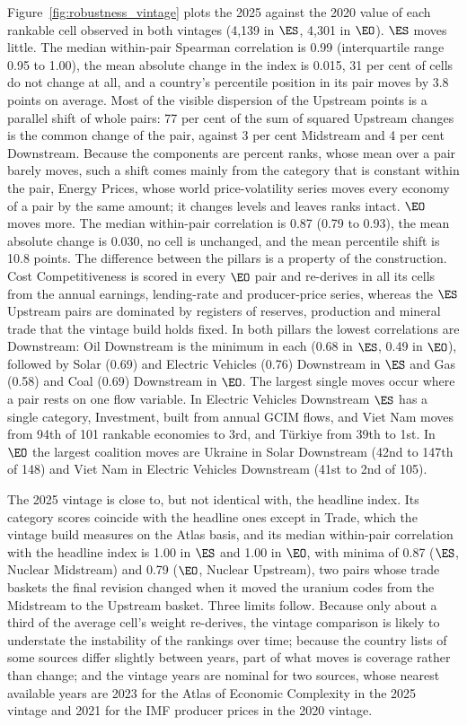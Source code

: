 Figure~\ref{fig:robustness_vintage} plots the 2025 against the 2020 value of each rankable
cell observed in both vintages (4{,}139 in $\ES$, 4{,}301 in $\EO$). $\ES$ moves little. The
median within-pair Spearman correlation is 0.99 (interquartile range 0.95 to 1.00), the mean
absolute change in the index is 0.015, 31 per cent of cells do not change at all, and a
country's percentile position in its pair moves by 3.8 points on average. Most of the visible
dispersion of the Upstream points is a parallel shift of whole pairs: 77 per cent of the sum of
squared Upstream changes is the common change of the pair, against 3 per cent Midstream and
4 per cent Downstream. Because the components are percent ranks, whose mean over a pair barely
moves, such a shift comes mainly from the category that is constant within the pair, Energy
Prices, whose world price-volatility series moves every economy of a pair by the same amount;
it changes levels and leaves ranks intact. $\EO$ moves more. The median within-pair
correlation is 0.87 (0.79 to 0.93), the mean absolute change is 0.030, no cell is unchanged,
and the mean percentile shift is 10.8 points. The difference between the pillars is a property
of the construction. Cost Competitiveness is scored in every $\EO$ pair and re-derives in all
its cells from the annual earnings, lending-rate and producer-price series, whereas the $\ES$
Upstream pairs are dominated by registers of reserves, production and mineral trade that the
vintage build holds fixed. In both pillars the lowest correlations are Downstream: Oil
Downstream is the minimum in each (0.68 in $\ES$, 0.49 in $\EO$), followed by Solar (0.69) and
Electric Vehicles (0.76) Downstream in $\ES$ and Gas (0.58) and Coal (0.69) Downstream in
$\EO$. The largest single moves occur where a pair rests on one flow variable. In Electric
Vehicles Downstream $\ES$ has a single category, Investment, built from annual GCIM flows, and
Viet Nam moves from 94th of 101 rankable economies to 3rd, and T\"urkiye from 39th to 1st. In
$\EO$ the largest coalition moves are Ukraine in Solar Downstream (42nd to 147th of 148) and Viet Nam in Electric Vehicles Downstream (41st to 2nd
of 105).

The 2025 vintage is close to, but not identical with, the headline index. Its category scores
coincide with the headline ones except in Trade, which the vintage build measures on the Atlas
basis, and its median within-pair correlation with the headline index is 1.00 in $\ES$ and
1.00 in $\EO$, with minima of 0.87 ($\ES$, Nuclear Midstream) and 0.79 ($\EO$, Nuclear
Upstream), two pairs whose trade baskets the final revision changed when it moved the uranium codes from the Midstream to the Upstream basket. Three limits
follow. Because only about a third of the average cell's weight re-derives, the vintage
comparison is likely to understate the instability of the rankings over time; because the
country lists of some sources differ slightly between years, part of what moves is coverage
rather than change; and the vintage years are nominal for two sources, whose nearest available
years are 2023 for the Atlas of Economic Complexity in the 2025 vintage and 2021 for the IMF
producer prices in the 2020 vintage.

